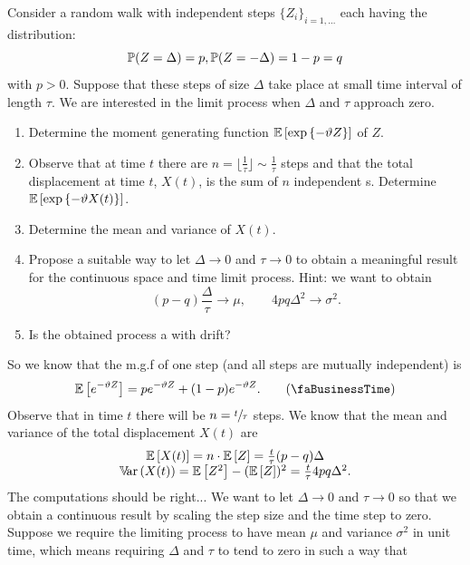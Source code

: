 \documentclass[12pt]{report}
\begin{document}
\begin{exercise}
	Consider a random walk with independent steps ${\{Z_{i}\}}_{i=1,\ldots}$ each having the distribution:
	\begin{equation*}
		\mathbb{P}(Z=\Delta)=p,\mathbb{P}(Z=-\Delta)=1-p=q
	\end{equation*}
	with $p>0$. Suppose that these steps of size $\Delta$ take place at small time interval of length $\tau$. We are interested in the limit process when $\Delta$ and $\tau$ approach zero.
	\begin{enumerate}
		\item Determine the moment generating function $\mathbb{E}\left[\exp\left\{-\vartheta Z\right\}\right]$ of $Z$.
		\item Observe that at time $t$ there are $n=\lfloor\frac{1}{\tau}\rfloor\sim\frac{1}{\tau}$ steps and that the total displacement at time $t$, $X(t)$, is the sum of $n$ independent \rv s. Determine $\mathbb{E}\left[\exp\left\{-\vartheta X(t)\right\}\right]$.
		\item Determine the mean and variance of $X(t)$.
		\item Propose a suitable way to let $\Delta\to0$ and $\tau\to0$ to obtain a meaningful result for the continuous space and time limit process. Hint: we want to obtain
		\begin{equation*}
			(p-q)\frac{\Delta}{\tau}\to\mu,\qquad4pq\Delta^{2}\to\sigma^{2}.
		\end{equation*}
		\item Is the obtained process a \bwm{} with drift?
	\end{enumerate}
\end{exercise}
So we know that the m.g.f of one step (and all steps are mutually independent) is
\begin{equation*}
	\ev{e^{-\vartheta Z}}=pe^{-\vartheta Z}+(1-p)e^{-\vartheta Z}.\tag{\faBusinessTime}\label{biz}
\end{equation*}
Observe that in time $t$ there will be $n=\sfrac{t}{\tau}$ steps. We know that the mean and variance of the total displacement $X(t)$ are
\begin{equation*}
	\begin{array}{c}
		\mathbb{E}\left[X(t)\right]=n\cdot\mathbb{E}\left[Z\right]=\frac{t}{\tau}(p-q)\Delta\\
		\mathbb{V}\!\mathrm{ar}\,(X(t))=\mathbb{E}\left[Z^{2}\right]-(\mathbb{E}\left[Z\right])^{2}=\frac{t}{\tau}4pq\Delta^{2}.
	\end{array}
\end{equation*}
The computations should be right... We want to let $\Delta\to0$ and $\tau\to0$ so that we obtain a continuous result by scaling the step size and the time step to zero. Suppose we require the limiting process to have mean $\mu$ and variance $\sigma^2$ in unit time, which means requiring $\Delta$ and $\tau$ to tend to zero in such a way that 
\end{document}
